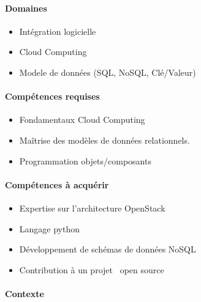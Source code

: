 \documentclass[a4paper,11pt]{article}
\begin{document}
\begin{note}

\vspace*{-.5cm}
\paragraph*{Domaines}

\begin{itemize}
 \item Intégration logicielle
 \item Cloud Computing
 \item Modele de données (SQL, NoSQL, Clé/Valeur)
\end{itemize}

\paragraph*{Compétences requises}

\begin{itemize}
 \item Fondamentaux Cloud Computing
 \item Maîtrise des modèles de données relationnels.
 \item Programmation objets/composants
\end{itemize}

\paragraph*{Compétences à acquérir}

\begin{itemize}
 \item Expertise sur l'architecture OpenStack
 \item Langage python
 \item Développement de schémas de données NoSQL
 \item Contribution à un projet \og~open source~\fg
\end{itemize}

\paragraph*{Contexte\\}


\end{note}
\end{document}
